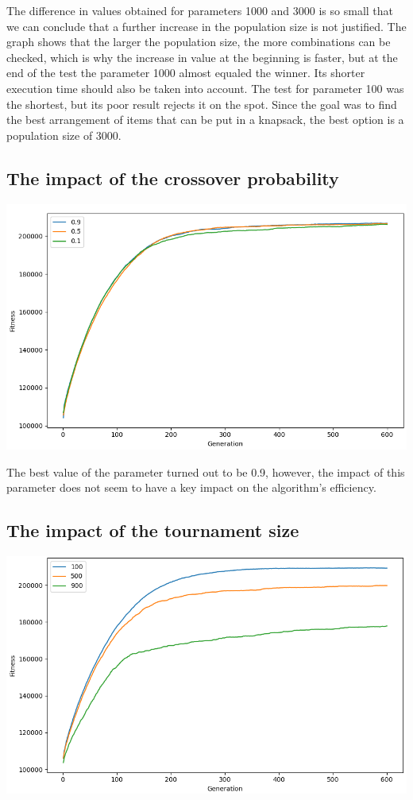 \documentclass[12pt]{article}
\begin{document}
The difference in values obtained for parameters 1000 and 3000 is so small that we can conclude that a further increase in the population size is not justified. The graph shows that the larger the population size, the more combinations can be checked, which is why the increase in value at the beginning is faster, but at the end of the test the parameter 1000 almost equaled the winner. Its shorter execution time should also be taken into account. The test for parameter 100 was the shortest, but its poor result rejects it on the spot. Since the goal was to find the best arrangement of items that can be put in a knapsack, the best option is a population size of 3000.

\subsection{The impact of the crossover probability}
\hspace*{-1.5cm}
\includegraphics[scale=0.55]{crossover}

The best value of the parameter turned out to be 0.9, however, the impact of this parameter does not seem to have a key impact on the algorithm's efficiency.

\subsection{The impact of the tournament size}
\hspace*{-1.5cm}
\includegraphics[scale=0.55]{tournament}
\end{document}

